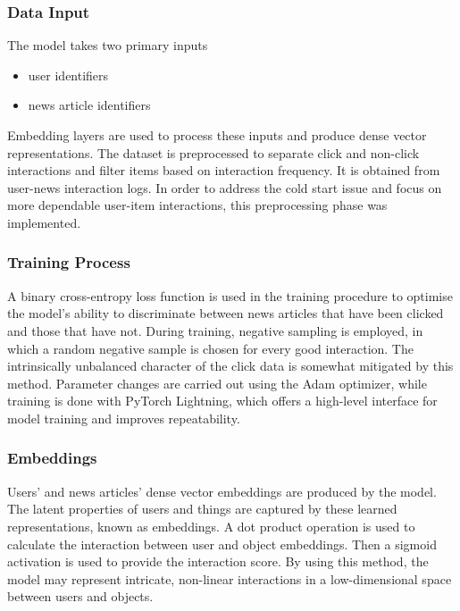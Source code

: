 \documentclass[9pt,twocolumn,twoside,lineno]{gsajnl}
\begin{document}
\subsubsection{Data Input\newline}
The model takes two primary inputs
\begin{itemize}[noitemsep]
    \item user identifiers
    \item news article identifiers
\end{itemize}
Embedding layers are used to process these inputs and produce dense vector representations. The dataset is preprocessed to separate click and non-click interactions and filter items based on interaction frequency. It is obtained from user-news interaction logs. In order to address the cold start issue and focus on more dependable user-item interactions, this preprocessing phase was implemented.

\subsubsection{Training Process\newline}
A binary cross-entropy loss function is used in the training procedure to optimise the model's ability to discriminate between news articles that have been clicked and those that have not. During training, negative sampling is employed, in which a random negative sample is chosen for every good interaction. The intrinsically unbalanced character of the click data is somewhat mitigated by this method. Parameter changes are carried out using the Adam optimizer, while training is done with PyTorch Lightning, which offers a high-level interface for model training and improves repeatability.

\subsubsection{Embeddings\newline}
Users' and news articles' dense vector embeddings are produced by the model. The latent properties of users and things are captured by these learned representations, known as embeddings. A dot product operation is used to calculate the interaction between user and object embeddings. Then a sigmoid activation is used to provide the interaction score. By using this method, the model may represent intricate, non-linear interactions in a low-dimensional space between users and objects.
\end{document}
